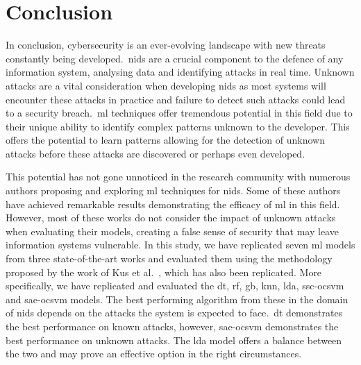 \chapter{Conclusion}%
\label{chp:conclusion}

In conclusion, cybersecurity is an ever-evolving landscape with new threats
constantly being developed.\ \gls{nids} are a crucial component to the defence
of any information system, analysing data and identifying attacks in real time.
Unknown attacks are a vital consideration when developing \gls{nids} as most
systems will encounter these attacks in practice and failure to detect such
attacks could lead to a security breach.\ \gls{ml} techniques offer tremendous
potential in this field due to their unique ability to identify complex
patterns unknown to the developer. This offers the potential to learn patterns
allowing for the detection of unknown attacks before these attacks are
discovered or perhaps even developed.

This potential has not gone unnoticed in the research community with numerous
authors proposing and exploring \gls{ml} techniques for \gls{nids}. Some of
these authors have achieved remarkable results demonstrating the efficacy of
\gls{ml} in this field. However, most of these works do not consider the impact
of unknown attacks when evaluating their models, creating a false sense of
security that may leave information systems vulnerable. In this study, we have
replicated seven \gls{ml} models from three state-of-the-art works and
evaluated them using the methodology proposed by the work of Kus et
al.~\cite{Kus}, which has also been replicated. More specifically, we have
replicated and evaluated the \gls{dt}, \gls{rf}, \gls{gb}, \gls{knn},
\gls{lda}, \gls{ssc}-\gls{ocsvm} and \gls{sae}-\gls{ocsvm} models. The best
performing algorithm from these in the domain of \gls{nids} depends on the
attacks the system is expected to face.\ \gls{dt} demonstrates the best
performance on known attacks, however, \gls{sae}-\gls{ocsvm} demonstrates the
best performance on unknown attacks. The \gls{lda} model offers a balance
between the two and may prove an effective option in the right circumstances.

